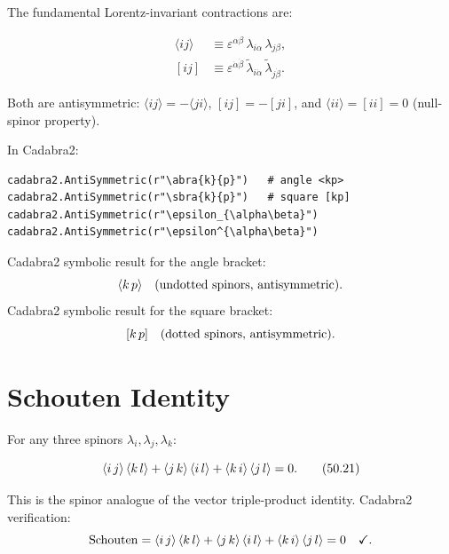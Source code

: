 The fundamental Lorentz-invariant contractions are:

\begin{mdframed}
\begin{align}
\langle ij\rangle &\equiv \varepsilon^{\alpha\beta}\,
\lambda_{i\alpha}\,\lambda_{j\beta} , \tag{50.16} \\[2mm]
[ij] &\equiv \varepsilon^{\dot\alpha\dot\beta}\,
\tilde\lambda_{i\dot\alpha}\,\tilde\lambda_{j\dot\beta} . \tag{50.17}
\end{align}
\end{mdframed}

Both are antisymmetric: $\langle ij\rangle=-\langle ji\rangle$,
$[ij]=-[ji]$, and $\langle ii\rangle=[ii]=0$ (null-spinor property).

In Cadabra2:
\begin{verbatim}
cadabra2.AntiSymmetric(r"\abra{k}{p}")   # angle <kp>
cadabra2.AntiSymmetric(r"\sbra{k}{p}")   # square [kp]
cadabra2.AntiSymmetric(r"\epsilon_{\alpha\beta}")
cadabra2.AntiSymmetric(r"\epsilon^{\alpha\beta}")
\end{verbatim}

Cadabra2 symbolic result for the angle bracket:
\begin{equation}
\langle k\, p \rangle\quad\text{(undotted spinors, antisymmetric)} .
\end{equation}
Cadabra2 symbolic result for the square bracket:
\begin{equation}
[ k\, p ]\quad\text{(dotted spinors, antisymmetric)} .
\end{equation}

\section{Schouten Identity}\label{sec:schouten}

For any three spinors $\lambda_i,\lambda_j,\lambda_k$:

\begin{mdframed}[backgroundcolor=yellow!5]
\begin{equation}
\langle i\, j \rangle\,\langle k\, l \rangle
+ \langle j\, k \rangle\,\langle i\, l \rangle
+ \langle k\, i \rangle\,\langle j\, l \rangle = 0 .
\tag{50.21}
\end{equation}
\end{mdframed}

This is the spinor analogue of the vector triple-product identity.
Cadabra2 verification:
\begin{equation}
\mathrm{Schouten} = \langle i\, j \rangle\,\langle k\, l \rangle + \langle j\, k \rangle\,\langle i\, l \rangle + \langle k\, i \rangle\,\langle j\, l \rangle = 0 \quad\checkmark .
\end{equation}


